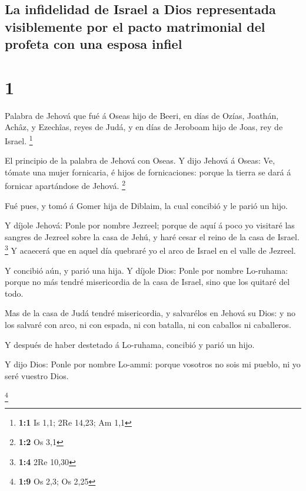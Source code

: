 \hypertarget{la-infidelidad-de-israel-a-dios-representada-visiblemente-por-el-pacto-matrimonial-del-profeta-con-una-esposa-infiel}{%
\subsection{La infidelidad de Israel a Dios representada visiblemente
por el pacto matrimonial del profeta con una esposa
infiel}\label{la-infidelidad-de-israel-a-dios-representada-visiblemente-por-el-pacto-matrimonial-del-profeta-con-una-esposa-infiel}}

\hypertarget{section}{%
\section{1}\label{section}}

 Palabra de Jehová que fué á Oseas hijo de Beeri, en días
de Ozías, Joathán, Achâz, y Ezechîas, reyes de Judá, y en días de
Jeroboam hijo de Joas, rey de Israel. \footnote{\textbf{1:1} Is 1,1; 2Re
  14,23; Am 1,1}

 El principio de la palabra de Jehová con Oseas. Y dijo
Jehová á Oseas: Ve, tómate una mujer fornicaria, é hijos de
fornicaciones: porque la tierra se dará á fornicar apartándose de
Jehová. \footnote{\textbf{1:2} Os 3,1}

 Fué pues, y tomó á Gomer hija de Diblaim, la cual
concibió y le parió un hijo.

 Y díjole Jehová: Ponle por nombre Jezreel; porque de aquí
á poco yo visitaré las sangres de Jezreel sobre la casa de Jehú, y haré
cesar el reino de la casa de Israel. \footnote{\textbf{1:4} 2Re 10,30}
 Y acaecerá que en aquel día quebraré yo el arco de Israel
en el valle de Jezreel.

 Y concibió aún, y parió una hija. Y díjole Dios: Ponle
por nombre Lo-ruhama: porque no más tendré misericordia de la casa de
Israel, sino que los quitaré del todo.

 Mas de la casa de Judá tendré misericordia, y salvarélos
en Jehová su Dios: y no los salvaré con arco, ni con espada, ni con
batalla, ni con caballos ni caballeros.

 Y después de haber destetado á Lo-ruhama, concibió y
parió un hijo.

 Y dijo Dios: Ponle por nombre Lo-ammi: porque vosotros no
sois mi pueblo, ni yo seré vuestro Dios.

\footnote{\textbf{1:9} Os 2,3; Os 2,25}

